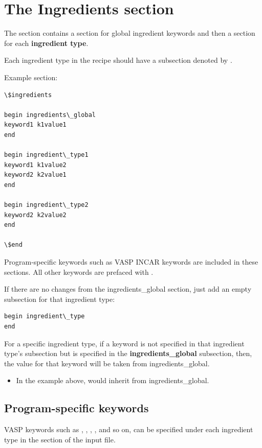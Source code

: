 \documentclass[letterpaper,10pt,english]{sphinxmanual}
\begin{document}
\section{The Ingredients section}
\label{3_1_2_ingredients::doc}\label{3_1_2_ingredients:the-ingredients-section}
The  section contains a section for global ingredient keywords and then a section for each \textbf{ingredient type}.

Each ingredient type in the recipe should have a subsection denoted by .

Example  section:

\begin{Verbatim}[commandchars=\\\{\}]
\$ingredients

begin ingredients\_global
keyword1 k1value1
end

begin ingredient\_type1
keyword1 k1value2
keyword2 k2value1
end

begin ingredient\_type2
keyword2 k2value2
end

\$end
\end{Verbatim}

Program-specific keywords such as VASP INCAR keywords are included in these sections. All other keywords are prefaced with .

If there are no changes from the ingredients\_global section, just add an empty subsection for that ingredient type:

\begin{Verbatim}[commandchars=\\\{\}]
begin ingredient\_type
end
\end{Verbatim}

For a specific ingredient type, if a keyword is not specified in that ingredient type's subsection but is specified in the \textbf{ingredients\_global} subsection, then, the value for that keyword will be taken from ingredients\_global.
\begin{itemize}
\item {} 
In the example above,  would inherit  from ingredients\_global.

\end{itemize}


\subsection{Program-specific keywords}
\label{3_1_2_ingredients:program-specific-keywords}
VASP keywords such as , , , , and so on, can be specified under each ingredient type in the  section of the input file.
\end{document}
